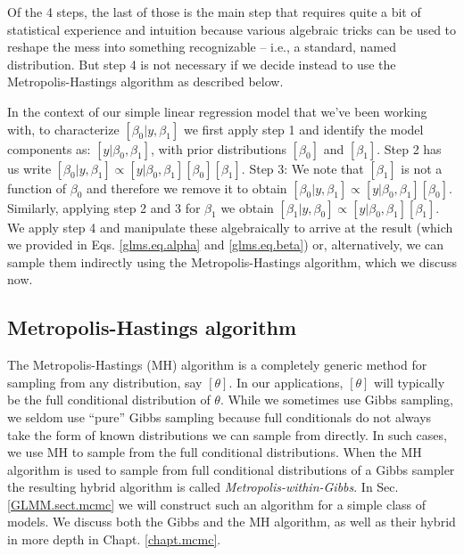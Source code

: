 
Of the 4 steps, the last of those is the main step that requires quite
a bit of statistical experience and intuition because various
algebraic tricks can be used to reshape the mess into something
recognizable -- i.e., a standard, named distribution. But step 4 is not
necessary if we decide instead to use the Metropolis-Hastings algorithm
as described below.

In the context of our simple linear regression model that we've been 
working with, to characterize $[\beta_0|y,\beta_1]$ we first apply step 1
and identify the model components as: $[y|\beta_0, \beta_1]$, with
prior distributions $[\beta_0]$
and $[\beta_1]$. Step 2 has us write $[\beta_0|y,\beta_1] \propto
[y|\beta_0,\beta_1][\beta_0][\beta_1]$.  Step 3: We note that $[\beta_1]$ is not a
function of $\beta_0$ and therefore we remove it to obtain $[\beta_0|y,\beta_1]
\propto [y|\beta_0,\beta_1][\beta_0]$. Similarly, applying step 2 and 3 for $\beta_1$ we obtain $[\beta_1|y,\beta_0]
\propto [y|\beta_0,\beta_1][\beta_1]$. We apply step 4 and manipulate
these algebraically to arrive at the result (which we provided in
Eqs. \ref{glms.eq.alpha} and \ref{glms.eq.beta}) or, alternatively, we can
sample them indirectly using the Metropolis-Hastings algorithm, which we 
discuss now.


\subsection{Metropolis-Hastings algorithm}

The Metropolis-Hastings (MH) algorithm is a completely generic method for
sampling from any distribution, say $[\theta]$. In our applications,
$[\theta]$ will typically be the full conditional distribution of
$\theta$.
While we sometimes use Gibbs sampling, we seldom
use ``pure'' Gibbs sampling because full conditionals do not always take the form of known distributions we can sample from directly. In such cases, we use MH to sample from the full conditional distributions.
When the MH algorithm is used to sample from  full
conditional distributions of a Gibbs sampler the resulting hybrid algorithm is
called
 {\it Metropolis-within-Gibbs}.
In Sec. \ref{GLMM.sect.mcmc} we will
 construct such an algorithm for a simple class of models. We discuss both the Gibbs and the MH algorithm, as well as their hybrid in more depth in Chapt. \ref{chapt.mcmc}.

